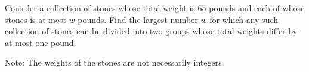 Consider a collection of stones whose total weight is $65$ pounds and each of whose stones is at most $w$ pounds. Find the largest number $w$ for which any such collection of stones can be divided into two groups whose total weights differ by at most one pound.

Note: The weights of the stones are not necessarily integers.